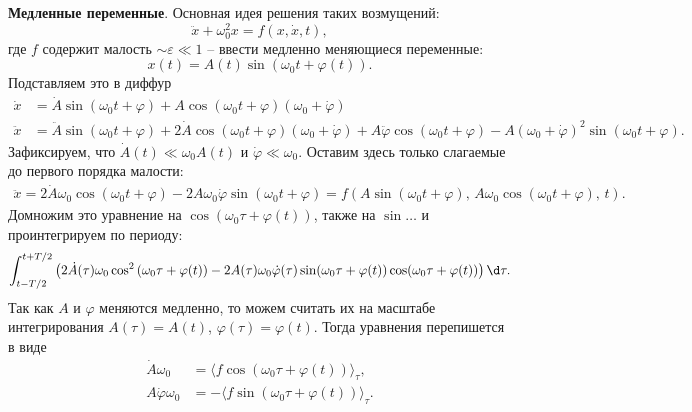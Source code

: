 \textbf{Медленные переменные}. 
Основная идея решения таких возмущений:
\begin{equation*}
    \ddot{x} + \omega_0^2 x = f(x, \dot{x}, t),
\end{equation*}
где $f$ содержит малость $\sim \varepsilon \ll 1$ -- ввести медленно меняющиеся переменные:
\begin{equation*}
    x(t) = A(t) \sin (\omega_0 t + \varphi(t)).
\end{equation*}
Подставляем это в диффур
\begin{align*}
    \dot{x} &= \dot{A} \sin(\omega_0 t + \varphi) + A \cos (\omega_0 t + \varphi) (\omega_0 + \dot{\varphi}) \\
    \ddot{x} &= \ddot{A} \sin (\omega_0 t + \varphi) + 2 \dot{A} \cos(\omega_0 t + \varphi) (\omega_0 + \dot{\varphi}) + A \ddot{\varphi} \cos(\omega_0  t + \varphi) - A (\omega_0 + \dot{\varphi})^2 \sin(\omega_0 t + \varphi).
\end{align*}
Зафиксируем, что $\dot{A} (t) \ll \omega_0 A(t)$ и $\dot{\varphi} \ll \omega_0$. Оставим здесь только слагаемые до первого порядка малости:
\begin{align*}
    \ddot{x} = 2 \dot{A} \omega_0 \cos(\omega_0 t + \varphi)  - 2 A \omega_0 \dot{\varphi} \sin(\omega_0 t + \varphi) = 
    f\left(
        A \sin(\omega_0 t + \varphi),\, A \omega_0 \cos (\omega_0 t + \varphi),\, t
    \right).
\end{align*}
Домножим это уравнение на $\cos(\omega_0 \tau + \varphi(t))$, также на $\sin \ldots$ и проинтегрируем по периоду:
\begin{equation*}
    \int_{t-T/2}^{t+T/2} \left(
        2 \dot{A}(\tau) \omega_0 \cos^2 \left(\omega_0 \tau + \varphi(t)\right) - 2 A(\tau) \omega_0 \dot{\varphi} (\tau) \sin(\omega_0 \tau + \varphi(t)) \cos(\omega_0 \tau + \varphi(t))
    \right) \d \tau.
\end{equation*}
Так как $A$ и $\varphi$ меняются медленно, то можем считать их на масштабе интегрирования $A(\tau) = A(t)$, $\varphi(\tau) = \varphi(t)$. 
Тогда уравнения перепишется в виде
\begin{align*}
    \dot{A} \omega_0 &= \langle f \cos(\omega_0 \tau + \varphi(t))\rangle_\tau, \\
    A \dot{\varphi} \omega_0 &= - \langle f \sin\left(\omega_0 \tau + \varphi(t)\right)\rangle_\tau.
\end{align*}


